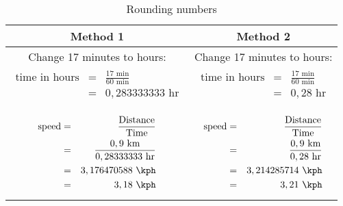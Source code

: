 \begin{table}[htbp]
\centering
\begin{tabular}{|c|c|}\hline
\textbf{Method 1}& \textbf{Method 2} \\\hline
Change 17 minutes to hours: & Change 17 minutes to hours:\\
\begin{minipage}[r]{0.45\textwidth}
\begin{eqnarray*}
 \textrm{time in hours} &=&  \frac{17 \textrm{ min}}{60 \textrm{ min}} \\
 &=& 0,283333333 \textrm{ hr}\\
\end{eqnarray*}
\end{minipage}
&
\begin{minipage}[l]{0.45\textwidth}
\begin{eqnarray*}
  \textrm{time in hours} &=&  \frac{17 \textrm{ min}}{60 \textrm{ min}} \\
&=& 0,28 \textrm{ hr} \\
\end{eqnarray*} 
\end{minipage}
\\
\hline
\begin{minipage}[r]{0.45\textwidth}
\begin{eqnarray*}
 \textrm{speed} &=& \frac{\textrm{Distance}}{\textrm{Time}}  \\
 &=& \frac{0,9 \textrm{ km}}{0,28333333 \textrm{ hr}}\\
&=& 3,176470588 \textrm{ \kph}\\
&=& 3,18 \textrm{ \kph}\\
\end{eqnarray*}
\end{minipage}
&
\begin{minipage}[l]{0.45\textwidth}
\begin{eqnarray*}
  \textrm{speed} &=& \frac{\textrm{Distance}}{\textrm{Time}} \\
&=& \frac{0,9 \textrm{ km}}{0,28 \textrm{ hr}} \\
 &=& 3,214285714 \textrm{ \kph}\\ 
&=& 3,21 \textrm{ \kph}\\
\end{eqnarray*} 
\end{minipage}
\\
\hline
\end{tabular}
\caption{Rounding numbers}
\label{tab:dim:rounding}
\end{table}

